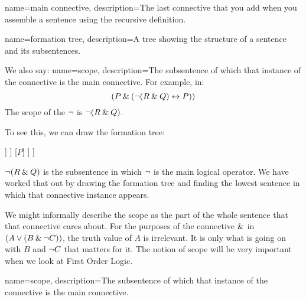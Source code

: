 {
	name=main connective,
	description={The last connective that you add when you assemble a sentence using the recursive definition.}
}

{
	name=formation tree,
	description={A tree showing the structure of a sentence and its subsentences.}
}



We also say: 
{
name=scope,
description={The subsentence of which that instance of the connective is the main connective.}
}
For example, in: 
$$(P \mathbin{\&} (\neg (R \mathbin{\&} Q) \leftrightarrow P))$$ 
The scope of the $\neg$  is $\neg (R\mathbin{\&} Q)$.

To see this, we can draw the formation tree:

\begin{center}
	\begin{forest}
[$(P \,\mainconnective{\eand}\,  (\enot (R \eand Q) \eiff P))$
	[$P$]
	[$(\enot (R \eand Q) \,\mainconnective{\eiff}\,  P))$
		[$\mainconnective{\enot}\,   (R \eand Q)$
			[$(R\,\mainconnective{\eand}\,   Q)$
				[$R$]
				[$Q$]
			]
		]
		[$P$]
	]
]
\end{forest}
\end{center}
$\neg (R\mathbin{\&} Q)$ is the subsentence in which $\neg$ is the main logical operator. We have worked that out by drawing the formation tree and finding the lowest sentence in which that connective instance appears. 

We might informally describe the scope as the part of the whole sentence that that connective cares about. For the purposes of the connective $\mathbin{\&}$ in $(A\vee (B\mathbin{\&} \neg C))$, the truth value of $A$ is irrelevant. It is only what is going on with $B$ and $\neg C$ that matters for it. The notion of scope will be very important when we look at First Order Logic.


{
name=scope,
description={The subsentence of which that instance of the connective is the main connective.}
}

